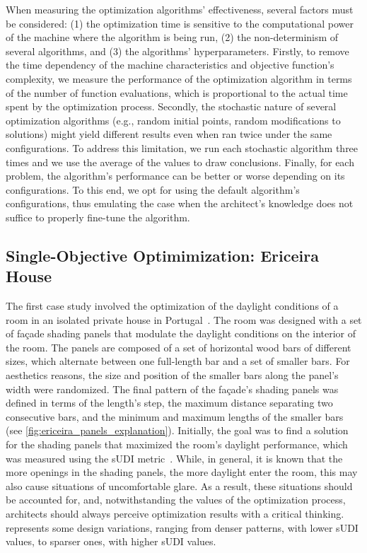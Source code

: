 When measuring the optimization algorithms' effectiveness, several factors must be considered: (1) the optimization time is sensitive to the computational power of the machine where the algorithm is being run, (2) the non-determinism of several algorithms, and (3) the algorithms' hyperparameters. Firstly, to remove the time dependency of the machine characteristics and objective function's complexity, we measure the performance of the optimization algorithm in terms of the number of function evaluations, which is proportional to the actual time spent by the optimization process. Secondly, the stochastic nature of several optimization algorithms (e.g., random initial points, random modifications to solutions) might yield different results even when ran twice under the same configurations. To address this limitation, we run each stochastic algorithm three times and we use the average of the values to draw conclusions. Finally, for each problem, the algorithm's performance can be better or worse depending on its configurations. To this end, we opt for using the default algorithm's configurations, thus emulating the case when the architect's knowledge does not suffice to properly fine-tune the algorithm. 

\subsection{Single-Objective Optimimization: Ericeira House}
\label{ssec:soocasestudy}
The first case study involved the optimization of the daylight conditions of a room in an isolated private house in Portugal~\cite{Caetano2018,Belem2018optimizeddesign}. The room was designed with a set of façade shading panels that modulate the daylight conditions on the interior of the room. The panels are composed of a set of horizontal wood bars of different sizes, which alternate between one full-length bar and a set of smaller bars. For aesthetics reasons, the size and position of the smaller bars along the panel's width were randomized. The final pattern of the façade's shading panels was defined in terms of the length’s step, the maximum distance separating two consecutive bars, and the minimum and maximum lengths of the smaller bars (see \cref{fig:ericeira_panels_explanation}). Initially, the goal was to find a solution for the shading panels that maximized the room's daylight performance, which was measured using the \ac{sUDI} metric~\cite{Nabil2006}. While, in general, it is known that the more openings in the shading panels, the more daylight enter the room, this may also cause situations of uncomfortable glare. As a result, these situations should be accounted for, and, notwithstanding the values of the optimization process, architects should always perceive optimization results with a critical thinking.  represents some design variations, ranging from denser patterns, with lower \ac{sUDI} values, to sparser ones, with higher \ac{sUDI} values.

